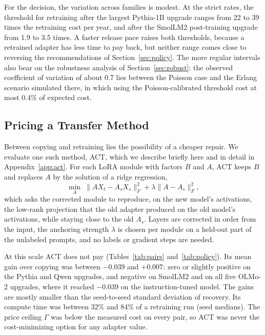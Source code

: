 \documentclass[ijds,nonblindrev]{informs4}
\begin{document}
For the decision, the variation across families is modest. At the strict rates, the threshold for retraining after the largest Pythia-1B upgrade ranges from 22 to 39 times the retraining cost per year, and after the SmolLM2 post-training upgrade from 1.9 to 3.5 times. A faster release pace raises both thresholds, because a retrained adapter has less time to pay back, but neither range comes close to reversing the recommendations of Section~\ref{sec:policy}. The more regular intervals also bear on the robustness analysis of Section~\ref{sec:robust}: the observed coefficient of variation of about 0.7 lies between the Poisson case and the Erlang scenario simulated there, in which using the Poisson-calibrated threshold cost at most 0.4\% of expected cost.

\subsection{Pricing a Transfer Method}\label{sec:act-results}

Between copying and retraining lies the possibility of a cheaper repair. We evaluate one such method, ACT, which we describe briefly here and in detail in Appendix~\ref{app:act}. For each LoRA module with factors $B$ and $A$, ACT keeps $B$ and replaces $A$ by the solution of a ridge regression,
\begin{equation}\label{eq:act}
\min_{A}\;\|AX_t-A_sX_s\|_F^2+\lambda\|A-A_s\|_F^2,
\end{equation}
which asks the corrected module to reproduce, on the new model's activations, the low-rank projection that the old adapter produced on the old model's activations, while staying close to the old $A_s$. Layers are corrected in order from the input, the anchoring strength $\lambda$ is chosen per module on a held-out part of the unlabeled prompts, and no labels or gradient steps are needed.

At this scale ACT does not pay (Tables~\ref{tab:pairs} and~\ref{tab:policy}). Its mean gain over copying was between $-0.039$ and $+0.007$: zero or slightly positive on the Pythia and Qwen upgrades, and negative on SmolLM2 and on all five OLMo-2 upgrades, where it reached $-0.039$ on the instruction-tuned model. The gains are mostly smaller than the seed-to-seed standard deviation of recovery. Its compute time was between 32\% and 84\% of a retraining run (seed medians). The price ceiling $\Gamma$ was below the measured cost on every pair, so ACT was never the cost-minimizing option for any adapter value.
\end{document}
